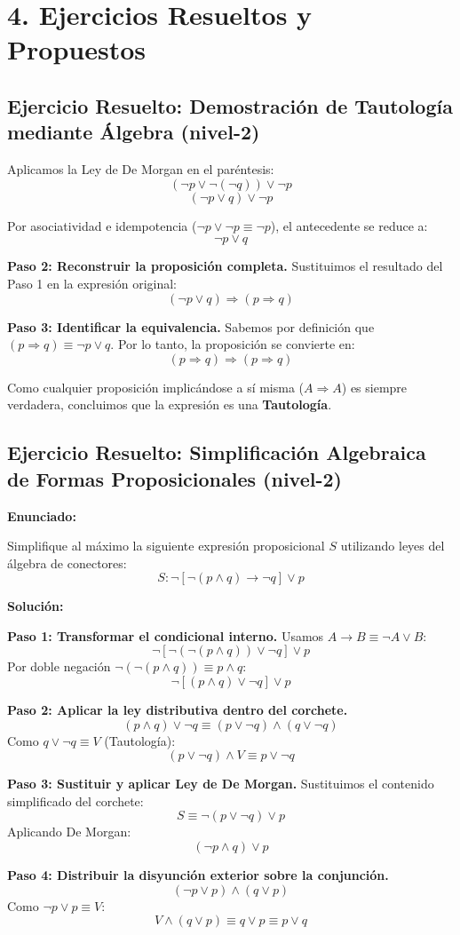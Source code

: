 \documentclass[11pt]{article}
\newenvironment{ejercicios}{\section*{4. Ejercicios Resueltos y Propuestos}}{}
\newenvironment{ejercicioresuelto}[2]{\subsection*{Ejercicio Resuelto: #1 \hfill \normalfont\small(#2)}}{}
\newcommand{\enunciado}[1]{\textbf{Enunciado:}\par#1\par\medskip}
\newcommand{\solucion}[1]{\textbf{Solución:}\par#1\par\bigskip}
\begin{document}
\begin{ejercicios}
\begin{ejercicioresuelto}{Demostración de Tautología mediante Álgebra}{nivel-2}
{      Aplicamos la Ley de De Morgan en el paréntesis:
      $$ (\neg p \vee \neg(\neg q)) \vee \neg p $$
      $$ (\neg p \vee q) \vee \neg p $$
      
      Por asociatividad e idempotencia ($\neg p \vee \neg p \equiv \neg p$), el antecedente se reduce a:
      $$ \neg p \vee q $$
      
      \textbf{Paso 2: Reconstruir la proposición completa.}
      Sustituimos el resultado del Paso 1 en la expresión original:
      $$ (\neg p \vee q) \Rightarrow (p \Rightarrow q) $$
      
      \textbf{Paso 3: Identificar la equivalencia.}
      Sabemos por definición que $(p \Rightarrow q) \equiv \neg p \vee q$. Por lo tanto, la proposición se convierte en:
      $$ (p \Rightarrow q) \Rightarrow (p \Rightarrow q) $$
      
      Como cualquier proposición implicándose a sí misma ($A \Rightarrow A$) es siempre verdadera, concluimos que la expresión es una \textbf{Tautología}.
    }
  \end{ejercicioresuelto}

  \begin{ejercicioresuelto}{Simplificación Algebraica de Formas Proposicionales}{nivel-2}
    \enunciado{
      Simplifique al máximo la siguiente expresión proposicional $S$ utilizando leyes del álgebra de conectores:
      $$ S: \neg[\neg(p \wedge q) \rightarrow \neg q] \vee p $$
    }
    \solucion{
      \textbf{Paso 1: Transformar el condicional interno.}
      Usamos $A \rightarrow B \equiv \neg A \vee B$:
      $$ \neg[\neg(\neg(p \wedge q)) \vee \neg q] \vee p $$
      Por doble negación $\neg(\neg(p \wedge q)) \equiv p \wedge q$:
      $$ \neg[(p \wedge q) \vee \neg q] \vee p $$

      \textbf{Paso 2: Aplicar la ley distributiva dentro del corchete.}
      $$ (p \wedge q) \vee \neg q \equiv (p \vee \neg q) \wedge (q \vee \neg q) $$
      Como $q \vee \neg q \equiv V$ (Tautología):
      $$ (p \vee \neg q) \wedge V \equiv p \vee \neg q $$

      \textbf{Paso 3: Sustituir y aplicar Ley de De Morgan.}
      Sustituimos el contenido simplificado del corchete:
      $$ S \equiv \neg(p \vee \neg q) \vee p $$
      Aplicando De Morgan:
      $$ (\neg p \wedge q) \vee p $$

      \textbf{Paso 4: Distribuir la disyunción exterior sobre la conjunción.}
      $$ (\neg p \vee p) \wedge (q \vee p) $$
      Como $\neg p \vee p \equiv V$:
      $$ V \wedge (q \vee p) \equiv q \vee p \equiv p \vee q $$

}
\end{ejercicioresuelto}
\end{ejercicios}
\end{document}
